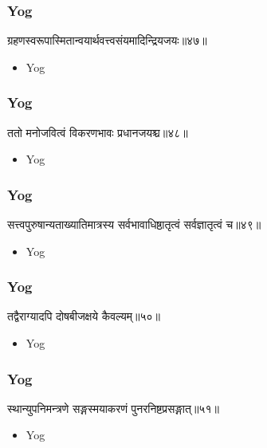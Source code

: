 \begin{frame}[fragile]\frametitle{Yog}
\begin{sanskrit}
ग्रहणस्वरूपास्मितान्वयार्थवत्त्वसंयमादिन्द्रियजयः॥४७॥
\end{sanskrit}
	\begin{itemize}
	\item Yog 
	\end{itemize}
\end{frame}



\begin{frame}[fragile]\frametitle{Yog}
\begin{sanskrit}
ततो मनोजवित्वं विकरणभावः प्रधानजयश्च॥४८॥
\end{sanskrit}
	\begin{itemize}
	\item Yog 
	\end{itemize}
\end{frame}


\begin{frame}[fragile]\frametitle{Yog}
\begin{sanskrit}
सत्त्वपुरुषान्यताख्यातिमात्रस्य सर्वभावाधिष्ठातृत्वं सर्वज्ञातृत्वं च॥४९॥
\end{sanskrit}
	\begin{itemize}
	\item Yog 
	\end{itemize}
\end{frame}


\begin{frame}[fragile]\frametitle{Yog}
\begin{sanskrit}
तद्वैराग्यादपि दोषबीजक्षये कैवल्यम्॥५०॥
\end{sanskrit}
	\begin{itemize}
	\item Yog 
	\end{itemize}
\end{frame}


\begin{frame}[fragile]\frametitle{Yog}
\begin{sanskrit}
स्थान्युपनिमन्त्रणे सङ्गस्मयाकरणं पुनरनिष्टप्रसङ्गात्॥५१॥
\end{sanskrit}
	\begin{itemize}
	\item Yog 
	\end{itemize}
\end{frame}

